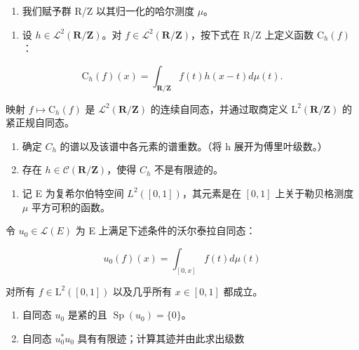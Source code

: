 \begin{enumerate}
\def\labelenumi{\arabic{enumi})}
\setcounter{enumi}{7}
\tightlist
\item
  我们赋予群 R/Z 以其归一化的哈尔测度 \(\mu\)。
\end{enumerate}

\begin{enumerate}
\def\labelenumi{\alph{enumi})}
\tightlist
\item
  设 \(h \in \mathcal{L}^{2}(\mathbf{R}/\mathbf{Z})\)。对 \(f \in \mathcal{L}^{2}(\mathbf{R}/\mathbf{Z})\)，按下式在 R/Z 上定义函数 \(\mathrm{C}_{h}(f)\)：
\end{enumerate}

\[
\mathrm{C} _ {h} (f) (x) = \int_ {\mathbf {R} / \mathbf {Z}} f (t) h (x - t) d \mu (t).
\]

映射 \(f \mapsto \mathrm{C}_h(f)\) 是 \(\mathcal{L}^2(\mathbf{R}/\mathbf{Z})\) 的连续自同态，并通过取商定义 \(\mathrm{L}^2(\mathbf{R}/\mathbf{Z})\) 的紧正规自同态。

\begin{enumerate}
\def\labelenumi{\alph{enumi})}
\setcounter{enumi}{1}
\item
  确定 \(C_{h}\) 的谱以及该谱中各元素的谱重数。（将 h 展开为傅里叶级数。）
\item
  存在 \(h \in \mathcal{C}(\mathbf{R}/\mathbf{Z})\)，使得 \(C_{h}\) 不是有限迹的。
\end{enumerate}

\begin{enumerate}
\def\labelenumi{\arabic{enumi})}
\setcounter{enumi}{8}
\tightlist
\item
  记 E 为复希尔伯特空间 \(L^{2}([0,1])\)，其元素是在 \([0,1]\) 上关于勒贝格测度 \(\mu\) 平方可积的函数。
\end{enumerate}

令 \(u_{0} \in \mathcal{L}(E)\) 为 E 上满足下述条件的沃尔泰拉自同态：

\[
u _ {0} (f) (x) = \int_ {[ 0, x ]} f (t) d \mu (t)
\]

对所有 \(f \in \mathrm{L}^2([0,1])\) 以及几乎所有 \(x \in [0,1]\) 都成立。

\begin{enumerate}
\def\labelenumi{\alph{enumi})}
\item
  自同态 \(u_{0}\) 是紧的且 \(\operatorname{Sp}(u_{0})=\{0\}\)。
\item
  自同态 \(u_0^* u_0\) 具有有限迹；计算其迹并由此求出级数
\end{enumerate}

